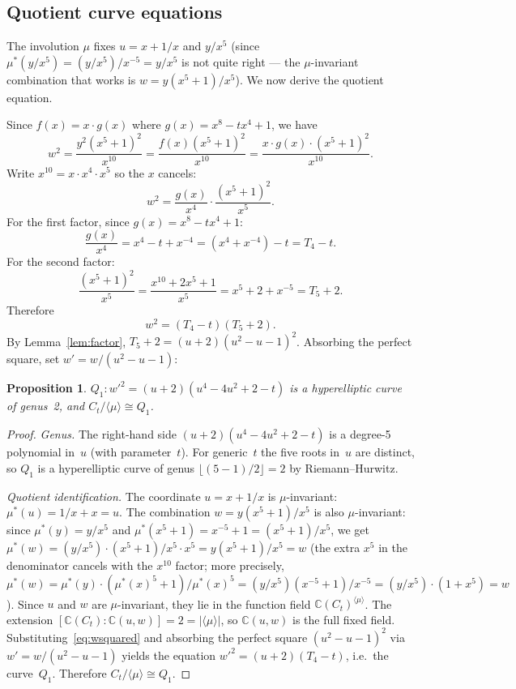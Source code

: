 \documentclass[11pt]{article}
\theoremstyle{plain}
\newtheorem{proposition}[theorem]{Proposition}
\theoremstyle{definition}
\theoremstyle{remark}
\newcommand{\C}{\mathbb{C}}
\begin{document}
\subsection{Quotient curve equations}

The involution $\mu$ fixes $u = x + 1/x$ and $y/x^5$
(since $\mu^*(y/x^5) = (y/x^5)/x^{-5} = y/x^5$ is not quite right ---
the $\mu$-invariant combination that works is $w = y(x^5+1)/x^5$).
We now derive the quotient equation.

Since $f(x) = x \cdot g(x)$ where $g(x) = x^8 - tx^4 + 1$, we have
\[
  w^2 = \frac{y^2(x^5+1)^2}{x^{10}}
  = \frac{f(x)(x^5+1)^2}{x^{10}}
  = \frac{x \cdot g(x) \cdot (x^5+1)^2}{x^{10}}.
\]
Write $x^{10} = x \cdot x^4 \cdot x^5$ so the $x$ cancels:
\[
  w^2 = \frac{g(x)}{x^4} \cdot \frac{(x^5+1)^2}{x^5}.
\]
For the first factor, since $g(x) = x^8 - tx^4 + 1$:
\[
  \frac{g(x)}{x^4}
  = x^4 - t + x^{-4}
  = (x^4 + x^{-4}) - t
  = T_4 - t.
\]
For the second factor:
\[
  \frac{(x^5+1)^2}{x^5}
  = \frac{x^{10} + 2x^5 + 1}{x^5}
  = x^5 + 2 + x^{-5}
  = T_5 + 2.
\]
Therefore
\begin{equation}\label{eq:wsquared}
  w^2 = (T_4 - t)(T_5 + 2).
\end{equation}
By Lemma~\ref{lem:factor}, $T_5 + 2 = (u+2)(u^2-u-1)^2$.
Absorbing the perfect square, set $w' = w/(u^2-u-1)$:

\begin{proposition}\label{prop:Q1}
$Q_1\colon w'^2 = (u+2)(u^4 - 4u^2 + 2 - t)$ is a hyperelliptic
curve of genus~2, and $C_t/\langle\mu\rangle \cong Q_1$.
\end{proposition}

\begin{proof}
\emph{Genus.}
The right-hand side $(u+2)(u^4 - 4u^2 + 2 - t)$ is a degree-5
polynomial in~$u$ (with parameter~$t$).  For generic~$t$ the five roots
in~$u$ are distinct, so $Q_1$ is a hyperelliptic curve of genus
$\lfloor(5-1)/2\rfloor = 2$ by Riemann--Hurwitz.

\emph{Quotient identification.}
The coordinate $u = x + 1/x$ is $\mu$-invariant:
$\mu^*(u) = 1/x + x = u$.  The combination
$w = y(x^5+1)/x^5$ is also $\mu$-invariant: since
$\mu^*(y) = y/x^5$ and $\mu^*(x^5+1) = x^{-5}+1 = (x^5+1)/x^5$,
we get $\mu^*(w) = (y/x^5) \cdot (x^5+1)/x^5 \cdot x^5 = y(x^5+1)/x^5 = w$
(the extra $x^5$ in the denominator cancels with the $x^{10}$ factor;
more precisely, $\mu^*(w) = \mu^*(y) \cdot (\mu^*(x)^5+1)/\mu^*(x)^5
= (y/x^5)(x^{-5}+1)/x^{-5} = (y/x^5) \cdot (1+x^5) = w$).
Since $u$ and $w$ are $\mu$-invariant, they lie in the function field
$\C(C_t)^{\langle\mu\rangle}$.  The extension
$[\C(C_t) : \C(u,w)] = 2 = |\langle\mu\rangle|$, so $\C(u,w)$
is the full fixed field.  Substituting~\eqref{eq:wsquared} and
absorbing the perfect square $(u^2-u-1)^2$ via $w' = w/(u^2-u-1)$
yields the equation $w'^2 = (u+2)(T_4-t)$, i.e.\ the curve~$Q_1$.
Therefore $C_t/\langle\mu\rangle \cong Q_1$.
\end{proof}
\end{document}
